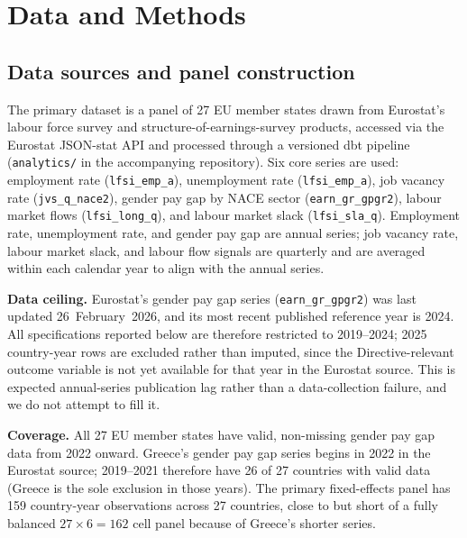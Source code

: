 \documentclass[12pt,a4paper]{article}
\begin{document}
\section{Data and Methods}
\label{sec:data}

\subsection{Data sources and panel construction}
\label{subsec:data_sources}

The primary dataset is a panel of 27 EU member states drawn from Eurostat's
labour force survey and structure-of-earnings-survey products, accessed via the
Eurostat JSON-stat API and processed through a versioned dbt pipeline
(\texttt{analytics/} in the accompanying repository).  Six core series are used:
employment rate (\texttt{lfsi\_emp\_a}), unemployment rate (\texttt{lfsi\_emp\_a}),
job vacancy rate (\texttt{jvs\_q\_nace2}), gender pay gap by NACE sector
(\texttt{earn\_gr\_gpgr2}), labour market flows (\texttt{lfsi\_long\_q}), and
labour market slack (\texttt{lfsi\_sla\_q}).  Employment rate, unemployment rate,
and gender pay gap are annual series; job vacancy rate, labour market slack, and
labour flow signals are quarterly and are averaged within each calendar year to
align with the annual series.

\medskip
\noindent\textbf{Data ceiling.} Eurostat's gender pay gap series
(\texttt{earn\_gr\_gpgr2}) was last updated 26~February~2026, and its most
recent published reference year is 2024.  All specifications reported below are
therefore restricted to 2019--2024; 2025 country-year rows are excluded rather
than imputed, since the Directive-relevant outcome variable is not yet available
for that year in the Eurostat source.  This is expected annual-series publication
lag rather than a data-collection failure, and we do not attempt to fill it.

\medskip
\noindent\textbf{Coverage.} All 27 EU member states have valid, non-missing
gender pay gap data from 2022 onward.  Greece's gender pay gap series begins in
2022 in the Eurostat source; 2019--2021 therefore have 26 of 27 countries with
valid data (Greece is the sole exclusion in those years).  The primary
fixed-effects panel has 159 country-year observations across 27 countries, close
to but short of a fully balanced $27 \times 6 = 162$ cell panel because of
Greece's shorter series.
\end{document}
